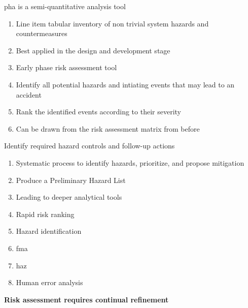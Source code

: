 \documentclass[aspectratio=1610,pdftex,dvipsnames,compress,xcolor={dvipsnames}]{beamer}
\newcommand{\acf}{\acrfull} %
\begin{document}
\addtocounter{framenumber}{-1}
\begin{frame}{\acf{pha} is a semi-quantitative analysis tool}
    \begin{enumerate}[series=outerlist,topsep=0pt,itemsep=15pt,leftmargin=*,label=(\arabic*)]
        \item[]Line item tabular inventory of non trivial system hazards and countermeasures
        \item[]Best applied in the design and development stage  
        \item[]Early phase risk assessment tool
        \item[]Identify all potential hazards and intiating events that may lead to an accident
        \item[]Rank the identified events according to their severity  
        \item[]Can be drawn from the risk assessment matrix from before
    \end{enumerate}
\end{frame}


\begin{frame}{Identify required hazard controls and follow-up actions}
    \begin{enumerate}[series=outerlist,topsep=0pt,itemsep=11pt,leftmargin=*,label=(\arabic*)]
        \item[]Systematic process to identify hazards, prioritize, and propose mitigation
        \item[]Produce a Preliminary Hazard List
        \item[]Leading to deeper analytical tools
        \item[]Rapid risk ranking  
        \item[]Hazard identification
        \item[]\acf{fma}
        \item[]\acf{haz}
        \item[]Human error analysis
    \end{enumerate}
\end{frame}


\begin{frame}[plain]{}
    \centering\Large\textbf{Risk assessment requires continual refinement}
\end{frame}
\end{document}
